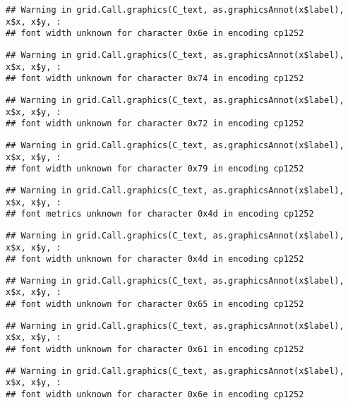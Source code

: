 \documentclass[
]{article}
\begin{document}
\begin{verbatim}
## Warning in grid.Call.graphics(C_text, as.graphicsAnnot(x$label), x$x, x$y, :
## font width unknown for character 0x6e in encoding cp1252
\end{verbatim}

\begin{verbatim}
## Warning in grid.Call.graphics(C_text, as.graphicsAnnot(x$label), x$x, x$y, :
## font width unknown for character 0x74 in encoding cp1252
\end{verbatim}

\begin{verbatim}
## Warning in grid.Call.graphics(C_text, as.graphicsAnnot(x$label), x$x, x$y, :
## font width unknown for character 0x72 in encoding cp1252
\end{verbatim}

\begin{verbatim}
## Warning in grid.Call.graphics(C_text, as.graphicsAnnot(x$label), x$x, x$y, :
## font width unknown for character 0x79 in encoding cp1252
\end{verbatim}

\begin{verbatim}
## Warning in grid.Call.graphics(C_text, as.graphicsAnnot(x$label), x$x, x$y, :
## font metrics unknown for character 0x4d in encoding cp1252
\end{verbatim}

\begin{verbatim}
## Warning in grid.Call.graphics(C_text, as.graphicsAnnot(x$label), x$x, x$y, :
## font width unknown for character 0x4d in encoding cp1252
\end{verbatim}

\begin{verbatim}
## Warning in grid.Call.graphics(C_text, as.graphicsAnnot(x$label), x$x, x$y, :
## font width unknown for character 0x65 in encoding cp1252
\end{verbatim}

\begin{verbatim}
## Warning in grid.Call.graphics(C_text, as.graphicsAnnot(x$label), x$x, x$y, :
## font width unknown for character 0x61 in encoding cp1252
\end{verbatim}

\begin{verbatim}
## Warning in grid.Call.graphics(C_text, as.graphicsAnnot(x$label), x$x, x$y, :
## font width unknown for character 0x6e in encoding cp1252
\end{verbatim}
\end{document}

